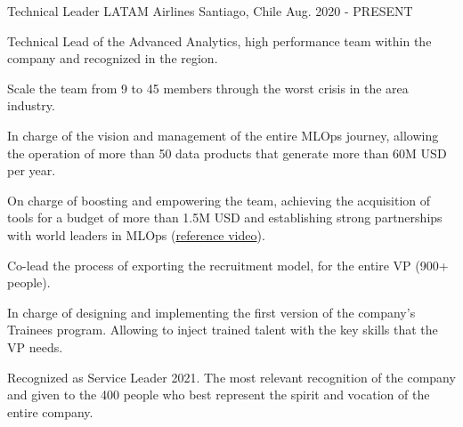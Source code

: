 

\begin{cventries}
  \cventry
    {Technical Leader} %
    {LATAM Airlines} %
    {Santiago, Chile} %
    {Aug. 2020 - PRESENT} %
    {
      \begin{cvitems} %
        \item {Technical Lead of the Advanced Analytics, high performance team within the company and recognized in the region. }
        \item {Scale the team from 9 to 45 members through the worst crisis in the area industry.}
        \item {In charge of the vision and management of the entire MLOps journey, allowing the operation of more than 50 data products that generate more than 60M USD per year.}
        \item {On charge of boosting and empowering the team, achieving the acquisition of tools for a budget of more than 1.5M USD and establishing strong partnerships with world leaders in MLOps (\href{https://youtu.be/kagDKNto1c4}{reference video}).}
        \item {Co-lead the process of exporting the recruitment model, for the entire VP (900+ people).}
        \item {In charge of designing and implementing the first version of the company's Trainees program. Allowing to inject trained talent with the key skills that the VP needs.}
      	\item {Recognized as Service Leader 2021. The most relevant recognition of the company and given to the 400 people who best represent the spirit and vocation of the entire company.}
      \end{cvitems}
    }


\end{cventries}
